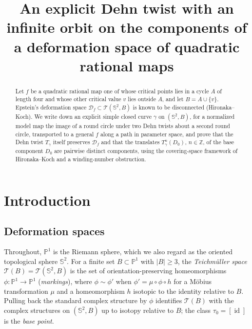 \documentclass[12pt]{article}
\title{An explicit Dehn twist with an infinite orbit on the components
of a deformation space of quadratic rational maps}
\author{}
\date{}
\newcommand{\Pone}{\mathbb P^1}
\newcommand{\Sph}{\mathbb S^2}
\newcommand{\Z}{\mathbb Z}
\newcommand{\Teich}{\mathcal T}
\newcommand{\D}{\mathcal D}
\newcommand{\id}{\operatorname{id}}
\theoremstyle{remark}
\numberwithin{equation}{section}
\begin{document}
\maketitle

\begin{abstract}
Let $f$ be a quadratic rational map one of whose critical points lies in a
cycle $A$ of length four and whose other critical value $v$ lies outside
$A$, and let $B=A\cup\{v\}$. Epstein's deformation space $\D_f\subset\Teich(\Sph,B)$ is
known to be disconnected (Hironaka--Koch). We write down an explicit simple
closed curve $\gamma$ on $(\Sph,B)$, for a normalized model map the image
of a round circle under two Dehn twists about a second round circle,
transported to a general $f$ along a path in parameter space, and prove
that the Dehn twist $T_\gamma$ itself preserves $\D_f$ and that the
translates $T_\gamma^n(D_0)$, $n\in\Z$, of the base component $D_0$ are
pairwise distinct components, using the covering-space framework of
Hironaka--Koch and a winding-number obstruction.
\end{abstract}

\section{Introduction}

\subsection{Deformation spaces}\label{sec:defspaces}

Throughout, $\Pone$ is the Riemann sphere, which we also regard as the
oriented topological sphere $\Sph$. For a finite set $B\subset\Pone$ with
$|B|\ge3$, the \emph{Teichm\"uller space} $\Teich(B)=\Teich(\Sph,B)$ is the
set of orientation-preserving homeomorphisms $\phi\colon\Pone\to\Pone$
(\emph{markings}), where $\phi\sim\phi'$ when $\phi'=\mu\circ\phi\circ h$
for a M\"obius transformation $\mu$ and a homeomorphism $h$ isotopic to the
identity relative to $B$. Pulling back the standard complex structure by
$\phi$ identifies $\Teich(B)$ with the complex structures on $(\Sph,B)$ up
to isotopy relative to $B$; the class $\tau_0=[\id]$ is the \emph{base
point}.
\end{document}
